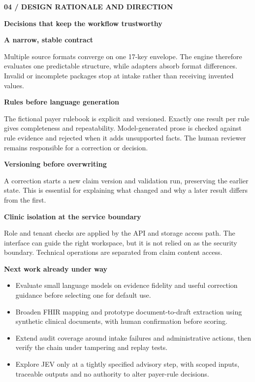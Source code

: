 \documentclass[10pt]{article}
\newcommand{\eyebrow}[1]{{\textbf{\footnotesize\color{teal}\MakeUppercase{#1}}\par}}
\newcommand{\claimtitle}[1]{{\fontsize{23}{27}\selectfont\bfseries\color{navy}#1\par}}
\newcommand{\smalltitle}[1]{{\large\bfseries\color{navy}#1\par}}
\begin{document}
\eyebrow{04 / design rationale and direction}
\claimtitle{Decisions that keep the workflow trustworthy}
\vspace{4mm}
\begin{minipage}[t]{.48\linewidth}
  \smalltitle{A narrow, stable contract}
  Multiple source formats converge on one 17-key envelope. The engine therefore evaluates one predictable structure, while adapters absorb format differences. Invalid or incomplete packages stop at intake rather than receiving invented values.\par\medskip
  \smalltitle{Rules before language generation}
  The fictional payer rulebook is explicit and versioned. Exactly one result per rule gives completeness and repeatability. Model-generated prose is checked against rule evidence and rejected when it adds unsupported facts. The human reviewer remains responsible for a correction or decision.\par\medskip
  \smalltitle{Versioning before overwriting}
  A correction starts a new claim version and validation run, preserving the earlier state. This is essential for explaining what changed and why a later result differs from the first.
\end{minipage}\hfill
\begin{minipage}[t]{.48\linewidth}
  \smalltitle{Clinic isolation at the service boundary}
  Role and tenant checks are applied by the API and storage access path. The interface can guide the right workspace, but it is not relied on as the security boundary. Technical operations are separated from claim content access.\par\medskip
  \smalltitle{Next work already under way}
  \begin{itemize}
    \item Evaluate small language models on evidence fidelity and useful correction guidance before selecting one for default use.
    \item Broaden FHIR mapping and prototype document-to-draft extraction using synthetic clinical documents, with human confirmation before scoring.
    \item Extend audit coverage around intake failures and administrative actions, then verify the chain under tampering and replay tests.
    \item Explore JEV only at a tightly specified advisory step, with scoped inputs, traceable outputs and no authority to alter payer-rule decisions.
  \end{itemize}
\end{minipage}
\vfill
{}
\end{document}
